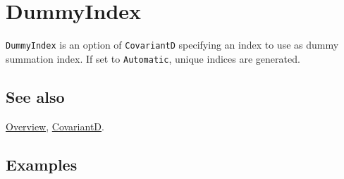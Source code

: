 \documentclass[../FeynCalcManual.tex]{subfiles}
\begin{document}
\hypertarget{dummyindex}{%
\section{DummyIndex}\label{dummyindex}}

\texttt{DummyIndex} is an option of \texttt{CovariantD} specifying an
index to use as dummy summation index. If set to \texttt{Automatic},
unique indices are generated.

\subsection{See also}

\hyperlink{toc}{Overview}, \hyperlink{covariantd}{CovariantD}.

\subsection{Examples}
\end{document}
